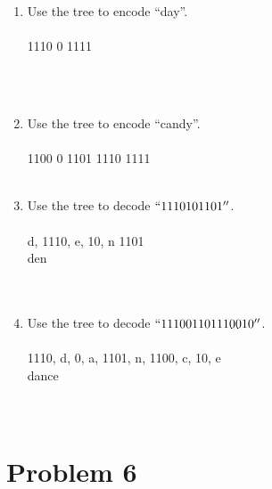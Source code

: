 \begin{enumerate}[label=(\alph*)]
\item Use the tree to encode ``day''.\\\\
1110 0 1111

\\\\
\item Use the tree to encode ``candy''.\\\\
1100 0 1101 1110 1111
\\\\
\item Use the tree to decode $``1110101101''$.\\\\
d, 1110, e, 10, n 1101 \\

den \\

\\\\
\item Use the tree to decode $``111001101110010''$.\\\\
1110, d, 0, a, 1101, n, 1100, c, 10, e \\

dance \\

\\\\

\end{enumerate}

 \newpage

\section*{Problem 6}

